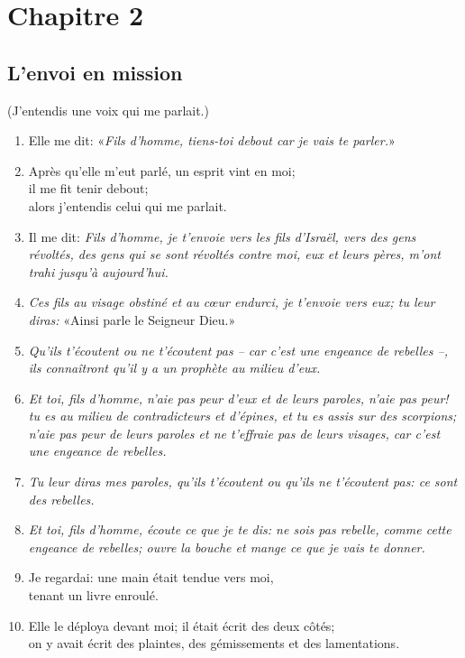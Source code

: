 \noindent
\section*{Chapitre 2}
\subsection*{L'envoi en mission}
(J'entendis une voix qui me parlait.)
\begin{enumerate}[leftmargin=\psleftmargin, labelsep = \pslabelsep, font=\color{\pscolor}\small\textsuperscript, parsep=0em, itemsep=0em, topsep=0em ]
  \item {Elle me dit: \brk
          «\textit{Fils d’homme, tiens-toi debout car je vais te parler.}»}
  \item Après qu’elle m’eut parlé, un esprit vint en moi; \\
        il me fit tenir debout; \\
        alors j’entendis celui qui me parlait.
  \item {Il me dit: \brk
          \textit{Fils d’homme, je t’envoie vers les fils d’Israël, \brk
            vers des gens révoltés, des gens qui se sont révoltés contre moi, \brk
            eux et leurs pères, m'ont trahi jusqu’à aujourd’hui.}}
  \item {\textit{Ces fils au visage obstiné et au cœur endurci, \brk
            je t’envoie vers eux; \brk
            tu leur diras:} \brk
          «Ainsi parle le Seigneur Dieu.»}
  \item {\textit{Qu’ils t’écoutent ou ne t’écoutent pas \brk
            – car c’est une engeance de rebelles –, \brk
            ils connaîtront qu’il y a un prophète au milieu d’eux.}}\verseSpace
  \item {\textit{Et toi, fils d’homme, n’aie pas peur d’eux et de leurs paroles, n’aie pas peur! \brk
            tu es au milieu de contradicteurs et d’épines, et tu es assis sur des scorpions; \brk
            n’aie pas peur de leurs paroles et ne t’effraie pas de leurs visages, \brk
            car c’est une engeance de rebelles.}}
  \item {\textit{Tu leur diras mes paroles, \brk
            qu’ils t’écoutent ou qu’ils ne t’écoutent pas: \brk
            ce sont des rebelles.}} \verseSpace
  \item {\textit{Et toi, fils d’homme, écoute ce que je te dis: \brk
            ne sois pas rebelle, comme cette engeance de rebelles; \brk
            ouvre la bouche et mange ce que je vais te donner.}}
  \item Je regardai: une main était tendue vers moi, \\
        tenant un livre enroulé.
  \item Elle le déploya devant moi; il était écrit des deux côtés; \\
        on y avait écrit des plaintes, des gémissements et des lamentations.
\end{enumerate}
\newpage
